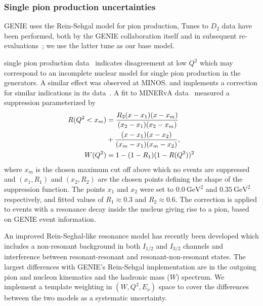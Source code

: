 \subsubsection{Single pion production uncertainties}
GENIE uses the Rein-Sehgal model for pion production,  Tunes to $D_2$ data have been performed, both by the GENIE collaboration itself and in subsequent re-evaluations~\cite{Rodrigues:2016xjj}; we use the latter tune as our base model.

\minerva single pion production data~\cite{Altinok:2017xua,McGivern:2016bwh,Eberly:2014mra} indicates disagreement at low $Q^2$ which may correspond to an incomplete nuclear model for single pion production in the generators. A similar effect was observed at MINOS\cite{minos_pi_q2}. and \nova implements a correction for similar indications in its data~\cite{nova_2018}.
A fit to MINERvA data~\cite{StowellThesis} measured a suppression parameterized by
\begin{align}
R(Q^{2}<x_m) & = 
\frac{R_{2} (x-x_1)(x-x_m)}{(x_2-x_1)(x_2-x_m)} \notag\\
&+ \frac{(x-x_1)(x-x_2)}{(x_m-x_1)(x_m-x_2)},  \\
W(Q^{2}) &= 1-(1-R_{1})(1-R(Q^{2}))^{2}
\end{align}
\noindent where $x_m$ is the chosen maximum cut off above which no events are suppressed and $(x_1,R_1)$ and $(x_2,R_2)$ are the chosen points defining the shape of the suppression function.
The points $x_1$ and $x_2$ were set to $0.0~\text{GeV}^2$ and $0.35~\text{GeV}^2$ respectively, and fitted values of $R_1\approx0.3$ and $R_2\approx0.6$. The correction is applied to events with a resonance decay inside the nucleus giving rise to a pion, based on GENIE event information. 

An improved Rein-Seghal-like resonance model has recently been developed\cite{minoo} which includes a non-resonant background in both $I_{1/2}$ and $I_{3/2}$ channels and interference between resonant-resonant and resonant-non-resonant states. %
The largest differences with GENIE's Rein-Sehgal implementation are in the outgoing pion and nucleon kinematics and the hadronic mass ($W$) spectrum. 
We implement a template weighting in $(W, Q^2, E_\nu)$ space to cover the differences between the two models as a systematic uncertainty.

